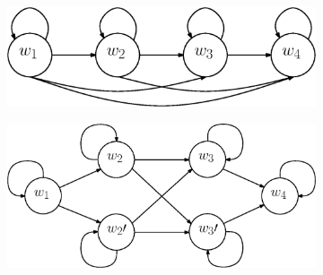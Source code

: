 \documentclass[a4paper, oneside]{csthesis}
\begin{document}
\begin{figure}
        ~ %
        \begin{subfigure}[b]{0.45\textwidth}
                \centering
                \includegraphics[width=\textwidth]{figures/hmm-ltr3.eps}
                \label{fig:hmm1}
        \end{subfigure}%
        \quad
        \begin{subfigure}[b]{0.45\textwidth}
                \centering
                \includegraphics[width=\textwidth]{figures/hmm-ltr5.eps}
                \label{fig:hmm1}
        \end{subfigure}%


\end{figure}
\end{document}
